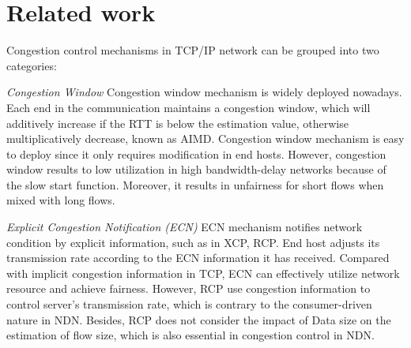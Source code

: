
\section{Related work}

\label{sec:related}




Congestion control mechanisms in TCP/IP network can be grouped into two categories:

\emph{Congestion Window} Congestion window mechanism is widely deployed nowadays. Each end in the communication maintains a congestion window, which will additively increase if the RTT is below the estimation value, otherwise multiplicatively decrease, known as AIMD\cite{TCP}. Congestion window mechanism is easy to deploy since it only requires modification in end hosts. However, congestion window results to low utilization in high bandwidth-delay networks because of the slow start function. Moreover, it results in unfairness for short flows when mixed with long flows.

\emph{Explicit Congestion Notification (ECN)} ECN mechanism notifies network condition by explicit information, such as in XCP\cite{XCP}, RCP\cite{RCP}. End host adjusts its transmission rate according to the ECN information it has received. Compared with implicit congestion information in TCP, ECN can effectively utilize network resource and achieve fairness. However, RCP use congestion information to control server's transmission rate, which is contrary to the consumer-driven nature in NDN. Besides, RCP does not consider the impact of Data size on the estimation of flow size, which is also essential in congestion control in NDN.

